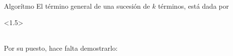 \documentclass{article}
\begin{document}
\begin{proofbox}[10]{Algorítmo}
    El término general de una sucesión de $k$ términos, está dada por
    \begin{center}
        \begin{derivation}<1.5>
                \\
            \\
        \end{derivation}
    \end{center}
    Por su puesto, hace falta demostrarlo:
\end{proofbox}
\clearpage
\end{document}
